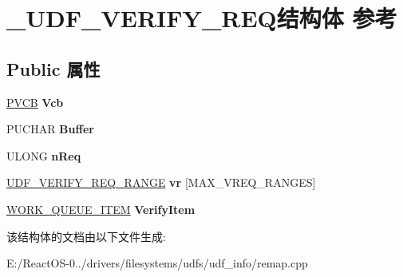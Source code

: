 \hypertarget{struct___u_d_f___v_e_r_i_f_y___r_e_q}{}\section{\+\_\+\+U\+D\+F\+\_\+\+V\+E\+R\+I\+F\+Y\+\_\+\+R\+E\+Q结构体 参考}
\label{struct___u_d_f___v_e_r_i_f_y___r_e_q}
\subsection*{Public 属性}
\begin{DoxyCompactItemize}
\item 
\mbox{\label{struct___u_d_f___v_e_r_i_f_y___r_e_q_a9621e8eda65f8fd555edca2d87872245}} 
\hyperlink{struct_d_e_v_i_c_e___e_x_t_e_n_s_i_o_n}{P\+V\+CB} {\bfseries Vcb}
\item 
\mbox{\label{struct___u_d_f___v_e_r_i_f_y___r_e_q_a0c14f3a1458639412ccb8c7ea9490944}} 
P\+U\+C\+H\+AR {\bfseries Buffer}
\item 
\mbox{\label{struct___u_d_f___v_e_r_i_f_y___r_e_q_a50c51bc1012dcf07e375a1e82e0d1d44}} 
U\+L\+O\+NG {\bfseries n\+Req}
\item 
\mbox{\label{struct___u_d_f___v_e_r_i_f_y___r_e_q_af336a268f1d7de4778b98b109e39367f}} 
\hyperlink{struct___u_d_f___v_e_r_i_f_y___r_e_q___r_a_n_g_e}{U\+D\+F\+\_\+\+V\+E\+R\+I\+F\+Y\+\_\+\+R\+E\+Q\+\_\+\+R\+A\+N\+GE} {\bfseries vr} \mbox{[}M\+A\+X\+\_\+\+V\+R\+E\+Q\+\_\+\+R\+A\+N\+G\+ES\mbox{]}
\item 
\mbox{\label{struct___u_d_f___v_e_r_i_f_y___r_e_q_a7f3d5d040636701a536dee67345ae883}} 
\hyperlink{struct___w_o_r_k___q_u_e_u_e___i_t_e_m}{W\+O\+R\+K\+\_\+\+Q\+U\+E\+U\+E\+\_\+\+I\+T\+EM} {\bfseries Verify\+Item}
\end{DoxyCompactItemize}


该结构体的文档由以下文件生成\+:\begin{DoxyCompactItemize}
\item 
E\+:/\+React\+O\+S-\/0../drivers/filesystems/udfs/udf\+\_\+info/remap.\+cpp\end{DoxyCompactItemize}
